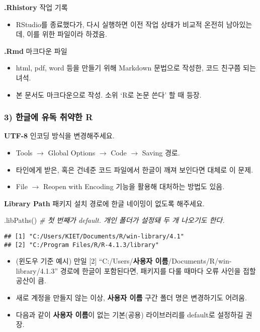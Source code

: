 \documentclass[
  12,
]{article}
\newenvironment{Shaded}{\begin{snugshade}}{\end{snugshade}}
\newcommand{\CommentTok}[1]{\textcolor[rgb]{0.56,0.35,0.01}{\textit{#1}}}
\newcommand{\FunctionTok}[1]{\textcolor[rgb]{0.00,0.00,0.00}{#1}}
\newcommand{\NormalTok}[1]{#1}
\providecommand{\tightlist}{%
  \setlength{\itemsep}{0pt}\setlength{\parskip}{0pt}}
\begin{document}
\textbf{.Rhistory} 작업 기록

\begin{itemize}
\tightlist
\item
  RStudio를 종료했다가, 다시 실행하면 이전 작업 상태가 비교적 온전히
  남아있는데, 이를 위한 파일이라 하겠음.
\end{itemize}

\textbf{.Rmd} 마크다운 파일

\begin{itemize}
\item
  html, pdf, word 등을 만들기 위해 Markdown 문법으로 작성한, 코드 친구쯤
  되는 녀석.
\item
  본 문서도 마크다운으로 작성. 소위 `R로 논문 쓴다' 할 때 등장.
\end{itemize}

\hypertarget{uxd55cuxae00uxc5d0-uxc720uxb3c5-uxcde8uxc57duxd55c-r}{%
\subsubsection{3) 한글에 유독 취약한
R}\label{uxd55cuxae00uxc5d0-uxc720uxb3c5-uxcde8uxc57duxd55c-r}}

\textbf{UTF-8} 인코딩 방식을 변경해주세요.

\begin{itemize}
\item
  Tools \(\to\) Global Options \(\to\) Code \(\to\) Saving 경로.
\item
  타인에게 받은, 혹은 건네준 코드 파일에서 한글이 깨져 보인다면 대체로
  이 문제.
\item
  File \(\to\) Reopen with Encoding 기능을 활용해 대처하는 방법도 있음.
\end{itemize}

\textbf{Library Path} 패키지 설치 경로에 한글 네이밍이 없도록 해주세요.

\begin{Shaded}
\begin{Highlighting}[]
\FunctionTok{.libPaths}\NormalTok{() }\CommentTok{\# 첫 번째가 default. 개인 폴더가 설정돼 두 개 나오기도 한다.}
\end{Highlighting}
\end{Shaded}

\begin{verbatim}
## [1] "C:/Users/KIET/Documents/R/win-library/4.1"
## [2] "C:/Program Files/R/R-4.1.3/library"
\end{verbatim}

\begin{itemize}
\item
  (윈도우 기준 예시) 만일 {[}2{]} ``C:/Users/\textbf{사용자
  이름}/Documents/R/win-library/4.1.3'' 경로에 한글이 포함된다면,
  패키지를 다룰 때마다 오류 사인을 접할 공산이 큼.
\item
  새로 계정을 만들지 않는 이상, \textbf{사용자 이름} 구간 폴더 명은
  변경하기도 어려움.
\item
  다음과 같이 \textbf{사용자 이름}이 없는 기본(공용) 라이브러리를
  default로 설정하길 권장.
\end{itemize}
\end{document}
